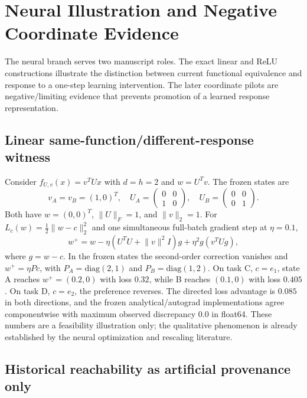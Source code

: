 \section{Neural Illustration and Negative Coordinate Evidence}

The neural branch serves two manuscript roles. The exact linear and ReLU constructions illustrate the distinction between current functional equivalence and response to a one-step learning intervention. The later coordinate pilots are negative/limiting evidence that prevents promotion of a learned response representation.

\subsection{Linear same-function/different-response witness}

Consider $f_{U,v}(x)=v^TUx$ with $d=h=2$ and $w=U^Tv$. The frozen states are
\begin{equation}
v_A=v_B=(1,0)^T,\quad U_A=\begin{pmatrix}0&0\\1&0\end{pmatrix},\quad U_B=\begin{pmatrix}0&0\\0&1\end{pmatrix}.
\end{equation}
Both have $w=(0,0)^T$, $\lVert U\rVert_F=1$, and $\lVert v\rVert_2=1$. For $L_c(w)=\tfrac12\lVert w-c\rVert_2^2$ and one simultaneous full-batch gradient step at $\eta=0.1$,
\begin{equation}
w^+=w-\eta(U^TU+\lVert v\rVert^2I)g+\eta^2g(v^TUg),
\end{equation}
where $g=w-c$. In the frozen states the second-order correction vanishes and $w^+=\eta Pc$, with $P_A=\mathrm{diag}(2,1)$ and $P_B=\mathrm{diag}(1,2)$. On task C, $c=e_1$, state A reaches $w^+=(0.2,0)$ with loss $0.32$, while B reaches $(0.1,0)$ with loss $0.405$. On task D, $c=e_2$, the preference reverses. The directed loss advantage is $0.085$ in both directions, and the frozen analytical/autograd implementations agree componentwise with maximum observed discrepancy $0.0$ in float64. These numbers are a feasibility illustration only; the qualitative phenomenon is already established by the neural optimization and rescaling literature.\cite{Neyshabur2015,Dinh2017,Lebeurrier2026}

\subsection{Historical reachability as artificial provenance only}

